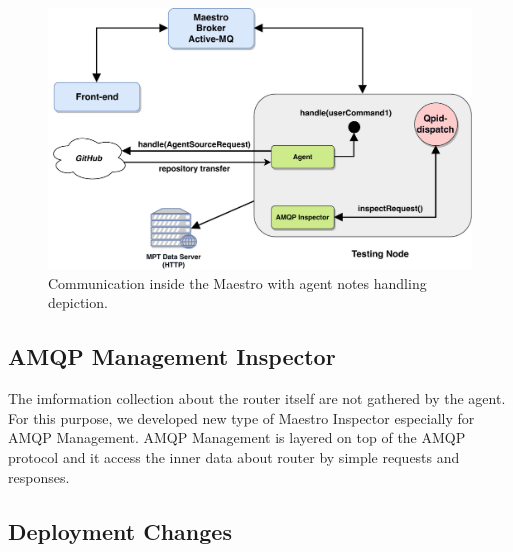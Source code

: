\begin{figure}[H]
  \centering
  \includegraphics[width=13cm]{obrazky-figures/agent_demo.pdf}
  \caption{Communication inside the Maestro with agent notes handling depiction.}
  \label{fig:agent_demo}
\end{figure}


\subsection{AMQP Management Inspector}
\label{AMQP Management Inspector}
The imformation collection about the router itself are not gathered by the agent. For this purpose, we developed new type of Maestro Inspector especially for AMQP Management. AMQP Management is layered on top of the AMQP protocol and it access the inner data about router by simple requests and responses. 

\subsection{Deployment Changes}

